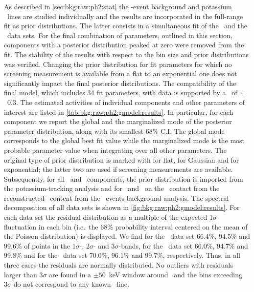 As described in \cref{sec:bkg:raw:ph2:stat} the \a-event background and
potassium \g\ lines are studied individually and the results are incorporated in the
full-range fit as prior distributions.  The latter consists in a simultaneous fit of the
\Mone\ and the \Mtwo\ data sets. For the final combination of parameters, outlined in this
section, components with a posterior distribution peaked at zero were removed from the
fit. The stability of the results with respect to the bin size and prior distributions was
verified. Changing the prior distribution for fit parameters for which no screening
measurement is available from a flat to an exponential one does not significantly impact
the final posterior distributions. The compatibility of the final model, which includes 34
fit parameters, with data is supported by a \pvalue\ of $\sim$~0.3.
\newpar
The estimated activities of individual components and other parameters of interest are
listed in \cref{tab:bkg:raw:ph2:gmodel:results}. In particular, for each component we
report the global and the marginalized mode of the posterior parameter distribution, along
with its smallest 68\% C.I. The global mode corresponds to the global best fit value while
the marginalized mode is the most probable parameter value when integrating over all other
parameters. The original type of prior distribution is marked with \m{[f]} for flat,
\m{[g]} for Gaussian and \m{[e]} for exponential; the latter two are used if screening
measurements are available. Subsequently, for all \kvn\ and \kvz\ components, the prior
distribution is imported from the potassium-tracking analysis and for \Pbh\ and \Bih\ on
the \pplus\ contact from the reconstructed \Ra\ content from the \a\ events background
analysis.
\newpar
The spectral decomposition of all data sets is shown in
\cref{fig:bkg:raw:ph2:gmodel:results}. For each data set the residual distribution as a
multiple of the expected 1$\sigma$ fluctuation in each bin (i.e.~the 68\% probability
interval centered on the mean of the Poisson distribution) is displayed. We find for the
\enrBEGeII\ data set 66.4\%, 94.5\% and 99.6\% of points in the 1$\sigma$-, 2$\sigma$- and
3$\sigma$-bands, for the \enrCoaxII\ data set 66.0\%, 94.7\% and 99.8\% and for the
\enrGeII\ data set 70.0\%, 96.1\% and 99.7\%, respectively. Thus, in all three cases the
residuals are normally distributed. No outliers with residuals larger than $3\sigma$ are
found in a $\pm50$~keV window around \qbb\ and the bins exceeding $3\sigma$ do not
correspond to any known \g\ line.

